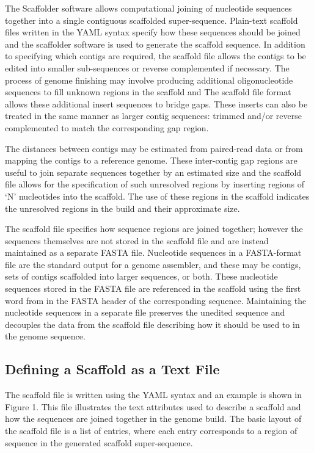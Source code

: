 \documentclass[10pt]{bmc_article}
\newenvironment{bmcformat}{\begin{raggedright}\baselineskip20pt\sloppy\setboolean{publ}{false}}{\end{raggedright}\baselineskip20pt\sloppy}
\begin{document}
\begin{bmcformat}
The Scaffolder software allows computational joining of nucleotide sequences
together into a single contiguous scaffolded super-sequence. Plain-text
scaffold files written in the YAML syntax specify how these sequences should be
joined and the scaffolder software is used to generate the scaffold sequence.
In addition to specifying which contigs are required, the scaffold file allows
the contigs to be edited into smaller sub-sequences or reverse complemented if
necessary. The process of genome finishing may involve producing additional
oligonucleotide sequences to fill unknown regions in the scaffold and The
scaffold file format allows these additional insert sequences to bridge gaps.
These inserts can also be treated in the same manner as larger contig
sequences: trimmed and/or reverse complemented to match the corresponding gap
region. \pb

The distances between contigs may be estimated from paired-read data or from
mapping the contigs to a reference genome. These inter-contig gap regions are
useful to join separate sequences together by an estimated size and the
scaffold file allows for the specification of such unresolved regions by
inserting regions of `N' nucleotides into the scaffold. The use of these
regions in the scaffold indicates the unresolved regions in the build and their
approximate size. \pb

The scaffold file specifies how sequence regions are joined together; however
the sequences themselves are not stored in the scaffold file and are instead
maintained as a separate FASTA file. Nucleotide sequences in a FASTA-format
file are the standard output for a genome assembler, and these may be contigs,
sets of contigs scaffolded into larger sequences, or both. These nucleotide
sequences stored in the FASTA file are referenced in the scaffold using the
first word from in the FASTA header of the corresponding sequence. Maintaining
the nucleotide sequences in a separate file preserves the unedited sequence and
decouples the data from the scaffold file describing how it should be used to
in the genome sequence. \pb

\subsection*{Defining a Scaffold as a Text File} %

The scaffold file is written using the YAML syntax and an example is shown in
Figure 1. This file illustrates the text attributes used to describe a scaffold
and how the sequences are joined together in the genome build. The basic layout
of the scaffold file is a list of entries, where each entry corresponds to
a region of sequence in the generated scaffold super-sequence. \pb


\end{bmcformat}
\end{document}
